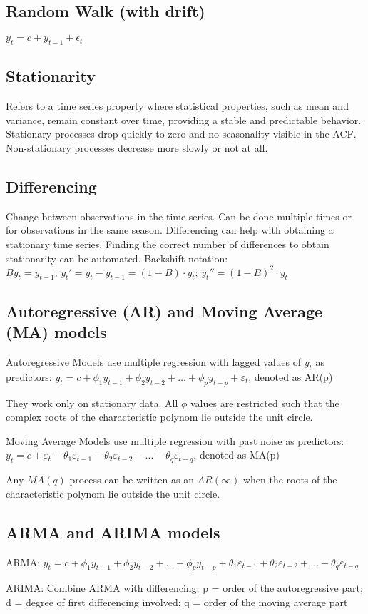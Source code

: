 \subsection{Random Walk (with drift)}
$ y_t = c + y_{t-1} + \epsilon_t $

\subsection{Stationarity}
Refers to a time series property where statistical properties, such as mean and variance, remain constant over time,
providing a stable and predictable behavior. Stationary processes drop quickly to zero and no seasonality visible in the ACF.
Non-stationary processes decrease more slowly or not at all.

\subsection{Differencing}
Change between observations in the time series. Can be done multiple times or for observations in the same season.
Differencing can help with obtaining a stationary time series. Finding the correct number of differences to obtain stationarity can be automated.
Backshift notation: $ By_t = y_{t-1} \text{; } y_t' = y_t - y_{t-1} = (1 - B) \cdot y_t \text{; } y_t'' = (1 - B)^2 \cdot y_t$

\subsection{Autoregressive (AR) and Moving Average (MA) models}
Autoregressive Models use multiple regression with lagged values of $ y_t $ as predictors:
$ y_t = c + \phi_1 y_{t-1} + \phi_2 y_{t-2} + \ldots + \phi_p y_{t-p} + \varepsilon_t $, denoted as AR(p)

They work only on stationary data. All $ \phi $ values are restricted such that the complex roots of the characteristic polynom lie outside the unit circle.

Moving Average Models use multiple regression with past noise as predictors:
$ y_t = c + \varepsilon_t - \theta_1 \varepsilon_{t-1} - \theta_2 \varepsilon_{t-2} - \ldots - \theta_q \varepsilon_{t-q} $, denoted as MA(p)

Any $ MA(q) $ process can be written as an $ AR(\infty) $ when the roots of the characteristic polynom lie outside the unit circle.

\subsection{ARMA and ARIMA models}
ARMA: $ y_t = c + \phi_1 y_{t-1} + \phi_2 y_{t-2} + \ldots + \phi_p y_{t-p} + \theta_1 \varepsilon_{t-1} + \theta_2 \varepsilon_{t-2} + \ldots - \theta_q \varepsilon_{t-q} $

ARIMA: Combine ARMA with differencing; p = order of the autoregressive part; d = degree of first differencing involved; q = order of the moving average part
